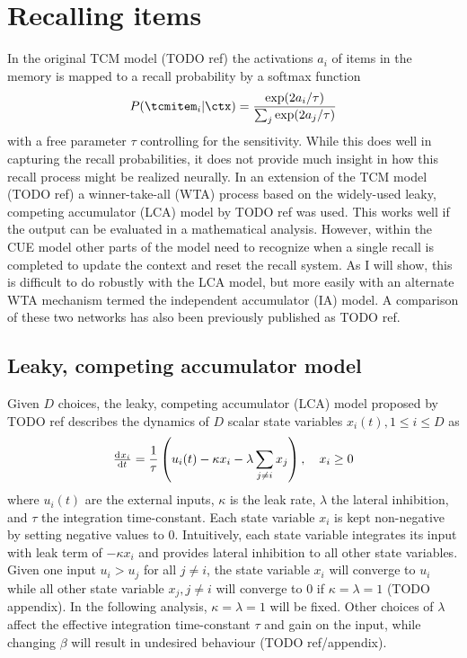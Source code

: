 \chapter{Recalling items}
In the original TCM model (TODO ref) the activations $a_i$ of items in the memory is mapped to a recall probability by a softmax function
\begin{equation}
    P(\tcmitem_i | \ctx) = \frac{\exp(2a_i/\tau)}{\sum_j \exp(2a_j/\tau)}
\end{equation}
with a free parameter $\tau$ controlling for the sensitivity.
While this does well in capturing the recall probabilities, it does not provide much insight in how this recall process might be realized neurally.
In an extension of the TCM model (TODO ref) a winner-take-all (WTA) process based on the widely-used leaky, competing accumulator (LCA) model by TODO ref was used.
This works well if the output can be evaluated in a mathematical analysis.
However, within the CUE model other parts of the model need to recognize when a single recall is completed to update the context and reset the recall system.
As I will show, this is difficult to do robustly with the LCA model, but more easily with an alternate WTA mechanism termed the independent accumulator (IA) model.
A comparison of these two networks has also been previously published as TODO ref.


\section{Leaky, competing accumulator model}
Given $D$ choices, the leaky, competing accumulator (LCA) model proposed by TODO ref describes the dynamics of $D$ scalar state variables $x_i(t), 1 \leq i \leq D$ as
\begin{equation}
    \od{x_i}{t} = \frac{1}{\tau} \del{u_i(t) -\kappa x_i - \lambda \sum_{j \neq i} x_j}, \quad x_i \geq 0 \label{eqn:lca}
\end{equation}
where $u_i(t)$ are the external inputs, $\kappa$ is the leak rate, $\lambda$ the lateral inhibition, and $\tau$ the integration time-constant.
Each state variable $x_i$ is kept non-negative by setting negative values to 0.
Intuitively, each state variable integrates its input with leak term of $-\kappa x_i$ and provides lateral inhibition to all other state variables.
Given one input $u_i > u_j$ for all $j \neq i$, the state variable $x_i$ will converge to $u_i$ while all other state variable $x_j, j \neq i$ will converge to $0$ if $\kappa = \lambda = 1$ (TODO appendix).
In the following analysis, $\kappa = \lambda = 1$ will be fixed.
Other choices of $\lambda$ affect the effective integration time-constant $\tau$ and gain on the input, while changing $\beta$ will result in undesired behaviour (TODO ref/appendix).

